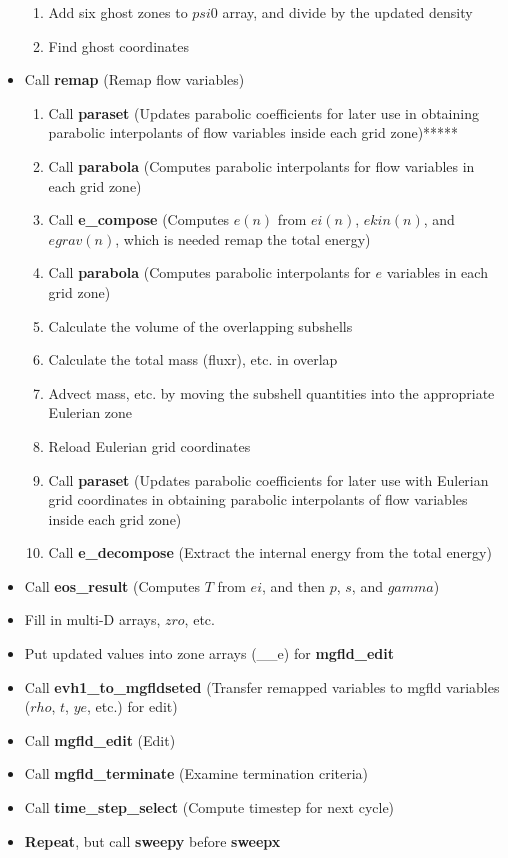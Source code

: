 \documentclass[11pt,doublespace]{article}
\begin{document}
\begin{itemize}
\begin{enumerate}
  \item Add six ghost zones to $psi0$ array, and divide by the updated density
  \item Find ghost coordinates
\end{enumerate}
  \item Call {\bf remap} (Remap flow variables)
\begin{enumerate}
  \item Call {\bf paraset} (Updates parabolic coefficients for later use in obtaining parabolic interpolants of flow variables inside each grid zone)*****
  \item Call {\bf parabola} (Computes parabolic interpolants for flow variables in each grid zone)
  \item Call {\bf e\_compose} (Computes $e(n)$ from $ei(n)$, $ekin(n)$, and $egrav(n)$, which is needed remap the total energy)
  \item Call {\bf parabola} (Computes parabolic interpolants for $e$ variables in each grid zone)
  \item Calculate the volume of the overlapping subshells
  \item Calculate the total mass (fluxr), etc. in overlap
  \item Advect mass, etc. by moving the subshell quantities into the appropriate Eulerian zone
  \item Reload Eulerian grid coordinates
  \item Call {\bf paraset} (Updates parabolic coefficients for later use with Eulerian grid coordinates in obtaining parabolic interpolants of flow variables inside each grid zone)
  \item Call {\bf e\_decompose} (Extract the internal energy from the total energy)
\end{enumerate}
  \item Call {\bf eos\_result} (Computes $T$ from $ei$, and then $p$, $s$, and $gamma$)
  \item Fill in multi-D arrays, $zro$, etc.
  \item Put updated values into zone arrays (\_\_e) for {\bf mgfld\_edit}
  \item Call {\bf evh1\_to\_mgfldseted} (Transfer remapped variables to mgfld variables ($rho$, $t$, $ye$, etc.) for edit)
  \item Call {\bf mgfld\_edit} (Edit)
  \item Call {\bf mgfld\_terminate} (Examine termination criteria)
  \item Call {\bf time\_step\_select} (Compute timestep for next cycle)
  \item {\Large {\bf Repeat}}, but call {\bf sweepy} before {\bf sweepx}
\end{itemize}
\end{document}
